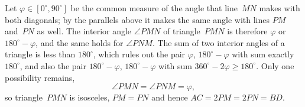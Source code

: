 {    Let $\varphi \in [0^\circ, 90^\circ]$ be the common measure of the angle that line~$MN$ makes with both diagonals; by the parallels above it makes the same angle with lines $PM$ and~$PN$ as well. The interior angle $\angle PMN$ of triangle~$PMN$ is therefore $\varphi$ or $180^\circ - \varphi$, and the same holds for $\angle PNM$. The sum of two interior angles of a triangle is less than $180^\circ$, which rules out the pair $\varphi$, $180^\circ - \varphi$ with sum exactly $180^\circ$, and also the pair $180^\circ - \varphi$, $180^\circ - \varphi$ with sum $360^\circ - 2\varphi \geq 180^\circ$. Only one possibility remains,
    $$
    \angle PMN = \angle PNM = \varphi,
    $$
    so triangle~$PMN$ is isosceles, $PM = PN$ and hence $AC = 2PM = 2PN = BD$.
}

